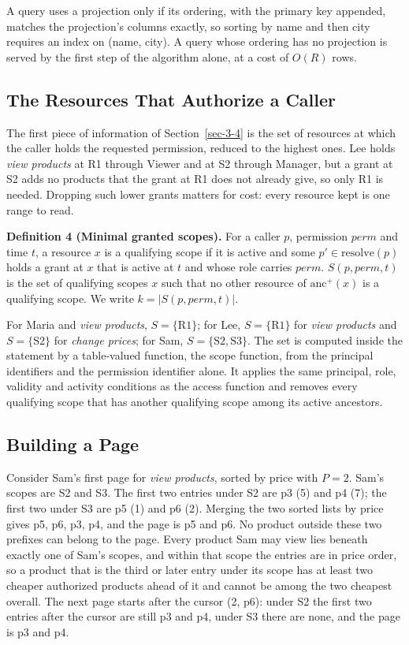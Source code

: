 \documentclass[conference]{IEEEtran}
\begin{document}
A query uses a projection only if its ordering, with the primary key appended, matches the projection's columns exactly, so sorting by name and then city requires an index on (name, city). A query whose ordering has no projection is served by the first step of the algorithm alone, at a cost of \(O(R)\) rows.

\subsection{The Resources That Authorize a Caller}\label{sec-4-3}

The first piece of information of Section~\ref{sec-3-4} is the set of resources at which the caller holds the requested permission, reduced to the highest ones. Lee holds \emph{view products} at R1 through Viewer and at S2 through Manager, but a grant at S2 adds no products that the grant at R1 does not already give, so only R1 is needed. Dropping such lower grants matters for cost: every resource kept is one range to read.

\textbf{Definition 4 (Minimal granted scopes).} For a caller \(p\), permission \(\mathit{perm}\) and time \(t\), a resource \(x\) is a qualifying scope if it is active and some \(p' \in \mathrm{resolve}(p)\) holds a grant at \(x\) that is active at \(t\) and whose role carries \(\mathit{perm}\). \(S(p, \mathit{perm}, t)\) is the set of qualifying scopes \(x\) such that no other resource of \(\mathrm{anc}^{+}(x)\) is a qualifying scope. We write \(k = |S(p, \mathit{perm}, t)|\).

For Maria and \emph{view products}, \(S = \{\mathrm{R1}\}\); for Lee, \(S = \{\mathrm{R1}\}\) for \emph{view products} and \(S = \{\mathrm{S2}\}\) for \emph{change prices}; for Sam, \(S = \{\mathrm{S2}, \mathrm{S3}\}\). The set is computed inside the statement by a table-valued function, the scope function, from the principal identifiers and the permission identifier alone. It applies the same principal, role, validity and activity conditions as the access function and removes every qualifying scope that has another qualifying scope among its active ancestors.

\subsection{Building a Page}\label{sec-4-4}

Consider Sam's first page for \emph{view products}, sorted by price with \(P = 2\). Sam's scopes are S2 and S3. The first two entries under S2 are p3 (5) and p4 (7); the first two under S3 are p5 (1) and p6 (2). Merging the two sorted lists by price gives p5, p6, p3, p4, and the page is p5 and p6. No product outside these two prefixes can belong to the page. Every product Sam may view lies beneath exactly one of Sam's scopes, and within that scope the entries are in price order, so a product that is the third or later entry under its scope has at least two cheaper authorized products ahead of it and cannot be among the two cheapest overall. The next page starts after the cursor (2, p6): under S2 the first two entries after the cursor are still p3 and p4, under S3 there are none, and the page is p3 and p4.
\end{document}
